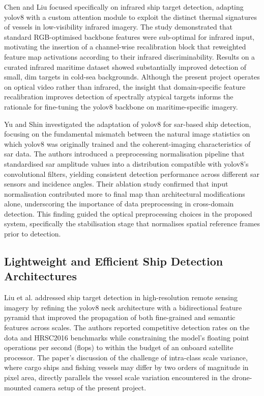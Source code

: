 \setlength{\parskip}{1em}
 
Chen and Liu \cite{Chen2024} focused specifically on infrared ship target detection, adapting \gls{yolov8} with a custom attention module to exploit the distinct thermal signatures of vessels in low-visibility infrared imagery. The study demonstrated that standard RGB-optimised backbone features were sub-optimal for infrared input, motivating the insertion of a channel-wise recalibration block that reweighted feature map activations according to their infrared discriminability. Results on a curated infrared maritime dataset showed substantially improved detection of small, dim targets in cold-sea backgrounds. Although the present project operates on optical video rather than infrared, the insight that domain-specific feature recalibration improves detection of spectrally atypical targets informs the rationale for fine-tuning the \gls{yolov8} backbone on maritime-specific imagery.
 
Yu and Shin \cite{Yu2023} investigated the adaptation of \gls{yolov8} for \gls{sar}-based ship detection, focusing on the fundamental mismatch between the natural image statistics on which \gls{yolov8} was originally trained and the coherent-imaging characteristics of \gls{sar} data. The authors introduced a preprocessing normalisation pipeline that standardised \gls{sar} amplitude values into a distribution compatible with \gls{yolov8}'s convolutional filters, yielding consistent detection performance across different \gls{sar} sensors and incidence angles. Their ablation study confirmed that input normalisation contributed more to final \gls{map} than architectural modifications alone, underscoring the importance of data preprocessing in cross-domain detection. This finding guided the optical preprocessing choices in the proposed system, specifically the stabilisation stage that normalises spatial reference frames prior to detection.
 
\subsection{\textbf{Lightweight and Efficient Ship Detection Architectures}}
 
Liu et al.\cite{Liu2025} addressed ship target detection in high-resolution remote sensing imagery by refining the \gls{yolov8} neck architecture with a bidirectional feature pyramid that improved the propagation of both fine-grained and semantic features across scales. The authors reported competitive detection rates on the \gls{dota} and HRSC2016 benchmarks while constraining the model's floating point operations per second (\gls{flops}) to within the budget of an onboard satellite processor. The paper's discussion of the challenge of intra-class scale variance,
where cargo ships and fishing vessels may differ by two orders of magnitude in pixel area, directly parallels the vessel scale variation encountered in the drone-mounted camera setup of the present project.
 
